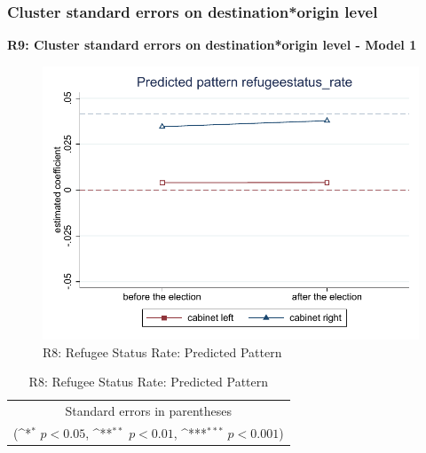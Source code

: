 \documentclass[10pt,a4paper]{scrartcl}
\begin{document}


\clearpage
\FloatBarrier
\subsubsection{Cluster standard errors on destination*origin level}
\textbf{R9: Cluster standard errors on destination*origin level - Model 1}
\begin{figure}[!ht]
	\centering
	\includegraphics[width=1\textwidth]{figures_edited/refugeestatus_rate_graph1_R8.pdf}
	\caption{R8: Refugee Status Rate: Predicted Pattern}
\end{figure}

\begin{table}[!ht]\centering
	\renewcommand{\arraystretch}{1.25}
	\def\sym#1{\ifmmode^{#1}\else\(^{#1}\)\fi}
	\caption{R8: Refugee Status Rate: Predicted Pattern}
	\begin{tabular}{l*{2}{c}}
		\hline\hline
		
		\hline\hline
		\multicolumn{3}{c}{\footnotesize Standard errors in parentheses} \\
		\multicolumn{3}{c}{\footnotesize (\sym{*} \(p<0.05\), \sym{**} \(p<0.01\), \sym{***} \(p<0.001\))}\\
	\end{tabular}
\end{table}
\end{document}
